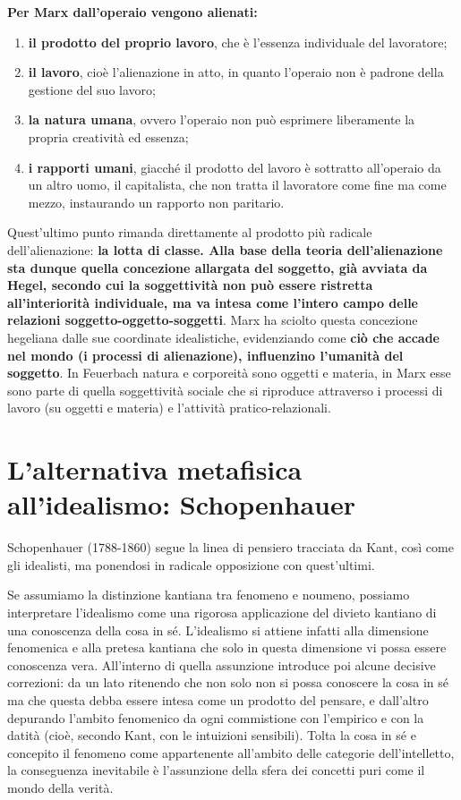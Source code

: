  \textbf{Per Marx dall'operaio vengono alienati:}
 
 \begin{enumerate}
 	\item \textbf{il prodotto del proprio lavoro}, che è l'essenza individuale del lavoratore;
 	\item \textbf{il lavoro}, cioè l'alienazione in atto, in quanto l'operaio non è padrone della gestione del suo lavoro;
 	\item \textbf{la natura umana}, ovvero l'operaio non può esprimere liberamente la propria creatività ed essenza;
 	\item \textbf{i rapporti umani}, giacché il prodotto del lavoro è sottratto all'operaio da un altro uomo, il capitalista, che non tratta il lavoratore come fine ma come mezzo, instaurando un rapporto non paritario.
 \end{enumerate}

Quest'ultimo punto rimanda direttamente al prodotto più radicale dell'alienazione: \textbf{la lotta di classe. Alla base della teoria dell'alienazione sta dunque quella concezione allargata del soggetto, già avviata da Hegel, secondo cui la soggettività non può essere ristretta all'interiorità individuale, ma va intesa come l'intero campo delle relazioni soggetto-oggetto-soggetti}. Marx ha sciolto questa concezione hegeliana dalle sue coordinate idealistiche, evidenziando come \textbf{ciò che accade nel mondo (i processi di alienazione), influenzino l'umanità del soggetto}. In Feuerbach natura e corporeità sono oggetti e materia, in Marx esse sono parte di quella soggettività sociale che si riproduce attraverso i processi di lavoro (su oggetti e materia) e l'attività pratico-relazionali.

\section{L'alternativa metafisica all'idealismo: Schopenhauer}

Schopenhauer (1788-1860) segue la linea di pensiero tracciata da Kant, così come gli idealisti, ma ponendosi in radicale opposizione con quest'ultimi.

Se assumiamo la distinzione kantiana tra fenomeno e noumeno, possiamo interpretare l'idealismo come una rigorosa applicazione del divieto kantiano di una conoscenza della cosa in sé. L'idealismo si attiene infatti alla dimensione fenomenica e alla pretesa kantiana che solo in questa dimensione vi possa essere conoscenza vera. All’interno di quella assunzione introduce poi alcune decisive correzioni: da un lato ritenendo che non solo non si possa conoscere la cosa in sé ma che questa debba essere intesa come un prodotto del pensare, e dall’altro depurando l’ambito fenomenico da ogni commistione con l’empirico e con la datità (cioè, secondo Kant, con le intuizioni sensibili). Tolta la cosa in sé e concepito il fenomeno come appartenente all’ambito delle categorie dell’intelletto, la conseguenza inevitabile è l’assunzione della sfera dei concetti puri come il mondo della verità.

